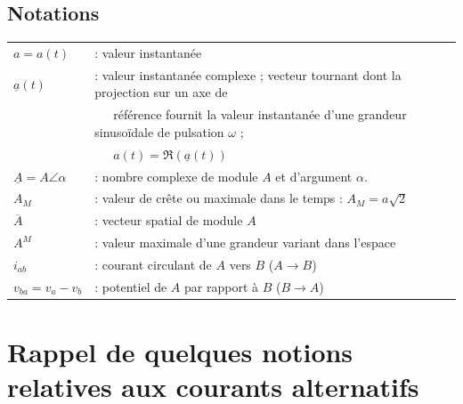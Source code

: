 	\subsection{Notations}
	\begin{tabular}{ll}
	$a = a(t)$ &: valeur instantanée\\
	$\underline{a}(t)$ &: valeur instantanée complexe ; vecteur tournant 
	dont la projection sur un axe de\\
	&\ \ \  référence fournit la valeur instantanée  
	d'une grandeur sinusoïdale de pulsation $\omega$ ; \\
	&\ \ \	$a(t) = \Re(
	\underline{a}(t))$\\
	$\underline{A} = A\angle\alpha$ &: nombre complexe de module $A$ et 
	d'argument $\alpha$.\\
	$A_M$ &: valeur de crête ou maximale dans le temps : $A_M = a \sqrt{2}$\\
	$\overline{A}$ &: vecteur spatial de module $A$\\
	$A^M$ &: valeur maximale d'une grandeur variant dans l'espace\\
	$i_{ab}$ &: courant circulant de $A$ vers $B$ ($A\rightarrow B$)\\
	$v_{ba} = v_a-v_b$ &: potentiel de $A$ par rapport à $B$ ($B \rightarrow A$)
	\end{tabular}

\section{Rappel de quelques notions relatives aux courants alternatifs}
